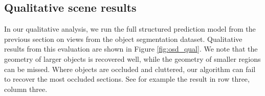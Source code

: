 \documentclass[10pt,twocolumn,letterpaper]{article}
\begin{document}
\subsection{Qualitative scene results}
\label{sec:qualit}
In our qualitative analysis, we run the full structured prediction model from the previous section on views from the object segmentation dataset.
Qualitative results from this evaluation are shown in Figure \ref{fig:osd_qual}.
We note that the geometry of larger objects is recovered well, while the geometry of smaller regions can be missed.
Where objects are occluded and cluttered, our algorithm can fail to recover the most occluded sections.
See for example the result in row three, column three.

\end{document}

